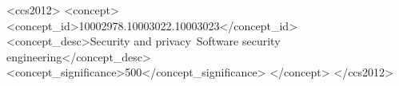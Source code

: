 \documentclass[acmsmall]{acmart}
\begin{document}
\begin{CCSXML}
<ccs2012>
<concept>
<concept_id>10002978.10003022.10003023</concept_id>
<concept_desc>Security and privacy~Software security engineering</concept_desc>
<concept_significance>500</concept_significance>
</concept>
</ccs2012>
\end{CCSXML}

                    

\maketitle


%






%








\appendix
\end{document}
